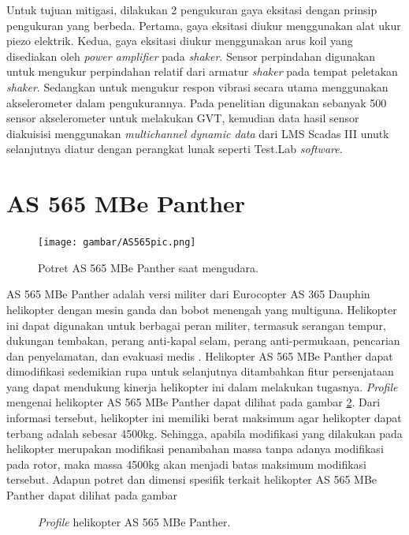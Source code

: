 Untuk tujuan mitigasi, dilakukan 2 pengukuran gaya eksitasi dengan prinsip pengukuran yang berbeda. Pertama, gaya eksitasi diukur menggunakan alat ukur piezo elektrik. Kedua, gaya eksitasi diukur menggunakan arus koil yang disediakan oleh \textit{power amplifier} pada \textit{shaker}. Sensor perpindahan digunakan untuk mengukur perpindahan relatif dari armatur \textit{shaker} pada tempat peletakan \textit{shaker}. Sedangkan untuk mengukur respon vibrasi secara utama menggunakan akselerometer dalam pengukurannya. Pada penelitian \cite{lubrina:hal-01059708} digunakan sebanyak 500 sensor akselerometer untuk melakukan GVT, kemudian data hasil sensor diakuisisi menggunakan \textit{multichannel dynamic data} dari LMS Scadas III unutk selanjutnya diatur dengan perangkat lunak seperti Test.Lab \textit{software}.


\section{AS 565 MBe Panther}
\label{sec:AS565MBe}

\begin{figure}[H]
	\centering
	\texttt{[image: gambar/AS565pic.png]}
	\caption{Potret AS 565 MBe Panther saat mengudara.}
	\label{fig:AS565pic}
\end{figure}

AS 565 MBe Panther adalah versi militer dari Eurocopter AS 365 Dauphin helikopter dengan mesin ganda dan bobot menengah yang multiguna. Helikopter ini dapat digunakan untuk berbagai peran militer, termasuk serangan tempur, dukungan tembakan, perang anti-kapal selam, perang anti-permukaan, pencarian dan penyelamatan, dan evakuasi medis \cite{AS565MBe}. Helikopter AS 565 MBe Panther dapat dimodifikasi sedemikian rupa untuk selanjutnya ditambahkan fitur persenjataan yang dapat mendukung kinerja helikopter ini dalam melakukan tugasnya. \textit{Profile} mengenai helikopter AS 565 MBe Panther dapat dilihat pada gambar \ref{fig:AS565MBe}. Dari informasi tersebut, helikopter ini memiliki berat maksimum agar helikopter dapat terbang adalah sebesar 4500kg. Sehingga, apabila modifikasi yang dilakukan pada helikopter merupakan modifikasi penambahan massa tanpa adanya modifikasi pada rotor, maka massa 4500kg akan menjadi batas maksimum modifikasi tersebut. Adapun potret dan dimensi spesifik terkait helikopter AS 565 MBe Panther dapat dilihat pada gambar

\begin{figure}[H]
	\centering
	\caption{\textit{Profile} helikopter AS 565 MBe Panther.}
	\label{fig:AS565MBe}
\end{figure}


